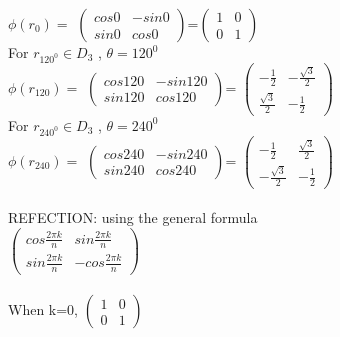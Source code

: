 \documentclass{article}
\begin{document}
$\phi(r_0) =  $ 
$\begin{pmatrix}
    cos 0 & -sin 0\\
    sin 0 & cos 0
\end{pmatrix}$=$\begin{pmatrix}
    1& 0\\
    0 & 1
\end{pmatrix}$\\

For $r_{120^0} \in D_3$ , $\theta = 120^0$\\

$\phi(r_{120}) =  $ 
$\begin{pmatrix}
    cos 120 & -sin 120\\
    sin 120 & cos 120
\end{pmatrix}$=
$\begin{pmatrix}
   - \frac{1}{2}& -\frac{\sqrt{3}}{2}\\
    \frac{\sqrt{3}}{2} & - \frac{1}{2}
\end{pmatrix}$
\\

For $r_{240^0} \in D_3$ , $\theta = 240^0$\\

$\phi(r_{240}) =  $ 
$\begin{pmatrix}
    cos 240 & -sin 240\\
    sin 240 & cos 240
\end{pmatrix}$=
$\begin{pmatrix}
   - \frac{1}{2}& \frac{\sqrt{3}}{2}\\
    -\frac{\sqrt{3}}{2} & - \frac{1}{2}
\end{pmatrix}$
\\\\

REFECTION: using the general formula\\

$\begin{pmatrix}
    cos \frac{2\pi k}{n} & sin\frac{2\pi k}{n}\\
    sin \frac{2\pi k}{n} & -cos \frac{2\pi k}{n}
\end{pmatrix}$\\\\

When k=0, $\begin{pmatrix}
    1 & 0\\
    0 & 1
\end{pmatrix}$\\\\
\end{document}
